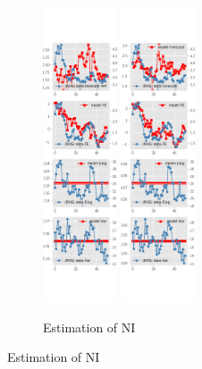 \documentclass[]{article}
\begin{document}
\begin{figure}[ht]
	\centering
	\begin{subfigure}[b]{\textwidth}
		\centering
		\caption{Estimation of NI}
		\label{NI_diag_SCE}
		\includegraphics[width=0.24\textwidth]{figures/sce_ni_est_diag0.png}
		\includegraphics[width=0.24\textwidth]{figures/sce_ni_est_diag1.png}

\end{subfigure}
\end{figure}
\end{document}
